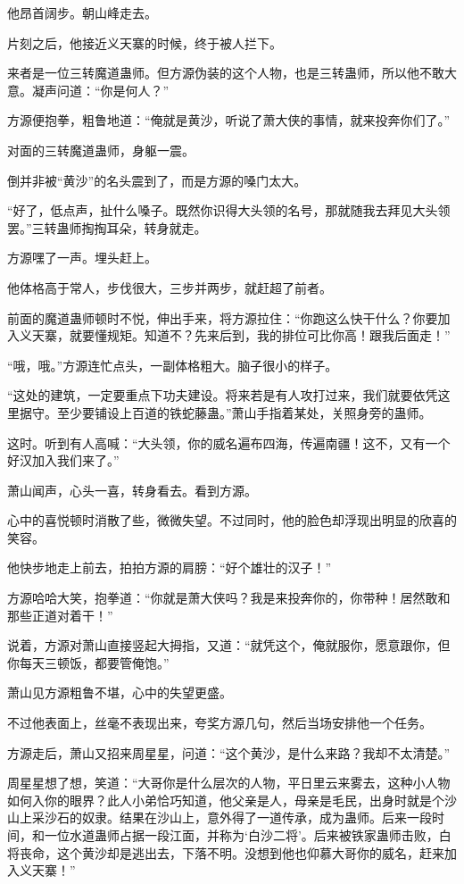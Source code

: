 \begin{this_body}
他昂首阔步。朝山峰走去。

片刻之后，他接近义天寨的时候，终于被人拦下。

来者是一位三转魔道蛊师。但方源伪装的这个人物，也是三转蛊师，所以他不敢大意。凝声问道：“你是何人？”

方源便抱拳，粗鲁地道：“俺就是黄沙，听说了萧大侠的事情，就来投奔你们了。”

对面的三转魔道蛊师，身躯一震。

倒并非被“黄沙”的名头震到了，而是方源的嗓门太大。

“好了，低点声，扯什么嗓子。既然你识得大头领的名号，那就随我去拜见大头领罢。”三转蛊师掏掏耳朵，转身就走。

方源嘿了一声。埋头赶上。

他体格高于常人，步伐很大，三步并两步，就赶超了前者。

前面的魔道蛊师顿时不悦，伸出手来，将方源拉住：“你跑这么快干什么？你要加入义天寨，就要懂规矩。知道不？先来后到，我的排位可比你高！跟我后面走！”

“哦，哦。”方源连忙点头，一副体格粗大。脑子很小的样子。

“这处的建筑，一定要重点下功夫建设。将来若是有人攻打过来，我们就要依凭这里据守。至少要铺设上百道的铁蛇藤蛊。”萧山手指着某处，关照身旁的蛊师。

这时。听到有人高喊：“大头领，你的威名遍布四海，传遍南疆！这不，又有一个好汉加入我们来了。”

萧山闻声，心头一喜，转身看去。看到方源。

心中的喜悦顿时消散了些，微微失望。不过同时，他的脸色却浮现出明显的欣喜的笑容。

他快步地走上前去，拍拍方源的肩膀：“好个雄壮的汉子！”

方源哈哈大笑，抱拳道：“你就是萧大侠吗？我是来投奔你的，你带种！居然敢和那些正道对着干！”

说着，方源对萧山直接竖起大拇指，又道：“就凭这个，俺就服你，愿意跟你，但你每天三顿饭，都要管俺饱。”

萧山见方源粗鲁不堪，心中的失望更盛。

不过他表面上，丝毫不表现出来，夸奖方源几句，然后当场安排他一个任务。

方源走后，萧山又招来周星星，问道：“这个黄沙，是什么来路？我却不太清楚。”

周星星想了想，笑道：“大哥你是什么层次的人物，平日里云来雾去，这种小人物如何入你的眼界？此人小弟恰巧知道，他父亲是人，母亲是毛民，出身时就是个沙山上采沙石的奴隶。结果在沙山上，意外得了一道传承，成为蛊师。后来一段时间，和一位水道蛊师占据一段江面，并称为‘白沙二将’。后来被铁家蛊师击败，白将丧命，这个黄沙却是逃出去，下落不明。没想到他也仰慕大哥你的威名，赶来加入义天寨！”


\end{this_body}
